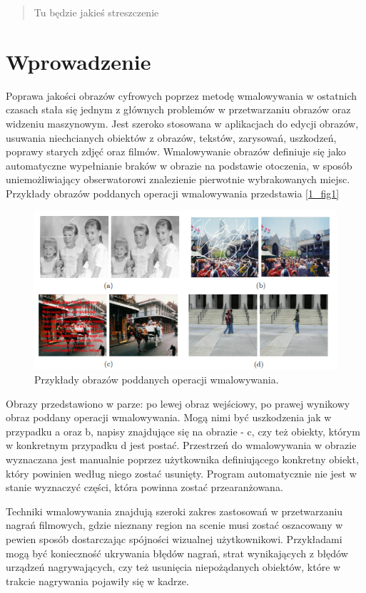 \documentclass[12pt, twoside, openany]{report}
\theoremstyle{definition}
\begin{document}
\begin{abstract}
Tu będzie jakieś streszczenie
\end{abstract}


\chapter{Wprowadzenie}
Poprawa jakości obrazów cyfrowych poprzez metodę wmalowywania w ostatnich czasach stała się jednym z głównych problemów w przetwarzaniu obrazów oraz widzeniu maszynowym. Jest szeroko stosowana w aplikacjach do edycji obrazów, usuwania niechcianych obiektów z obrazów, tekstów, zarysowań, uszkodzeń, poprawy starych zdjęć oraz filmów. Wmalowywanie obrazów definiuje się jako automatyczne wypełnianie braków w obrazie na podstawie otoczenia, w sposób uniemożliwiający obserwatorowi znalezienie pierwotnie wybrakowanych miejsc. Przykłady obrazów poddanych operacji wmalowywania przedstawia \autoref{1_fig1} 
\begin{figure}[!h]
	\centering
	\includegraphics[scale=0.7]{rysunki/fig1}
	\caption{Przykłady obrazów poddanych operacji wmalowywania.}
	\label{1_fig1}
\end{figure}
\par
Obrazy przedstawiono w parze: po lewej obraz wejściowy, po prawej wynikowy obraz poddany operacji wmalowywania. Mogą nimi być uszkodzenia jak w przypadku a oraz b, napisy znajdujące się na obrazie - c, czy też obiekty, którym w konkretnym przypadku d jest postać. Przestrzeń do wmalowywania w obrazie wyznaczana jest manualnie poprzez użytkownika definiującego konkretny obiekt, który powinien według niego zostać usunięty. Program automatycznie nie jest w stanie wyznaczyć części, która powinna zostać przearanżowana.
\par
Techniki wmalowywania znajdują szeroki zakres zastosowań w przetwarzaniu nagrań filmowych, gdzie nieznany region na scenie musi zostać oszacowany w pewien sposób dostarczając spójności wizualnej użytkownikowi. Przykładami mogą być konieczność ukrywania błędów nagrań, strat wynikających z błędów urządzeń nagrywających, czy też usunięcia niepożądanych obiektów, które w trakcie nagrywania pojawiły się w kadrze.
\end{document}
